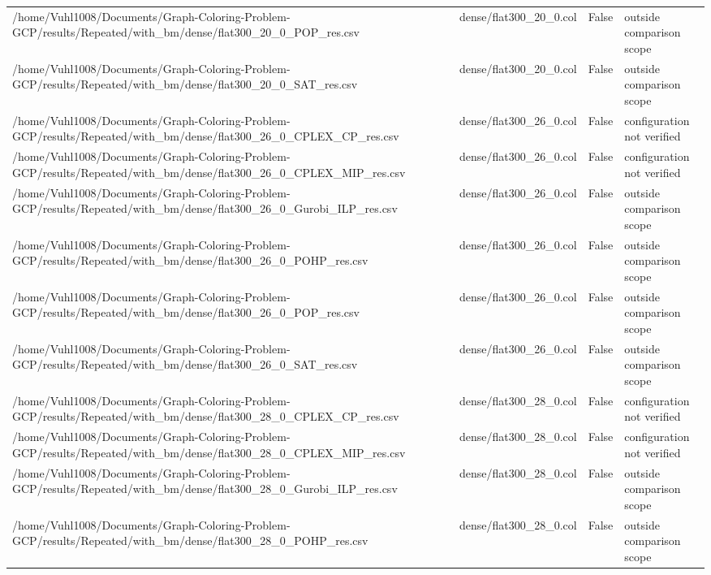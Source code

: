 \begin{table}[htbp]
\begin{tabular}{llll}
/home/Vuhl1008/Documents/Graph-Coloring-Problem-GCP/results/Repeated/with\_bm/dense/flat300\_20\_0\_POP\_res.csv & dense/flat300\_20\_0.col & False & outside comparison scope \\
/home/Vuhl1008/Documents/Graph-Coloring-Problem-GCP/results/Repeated/with\_bm/dense/flat300\_20\_0\_SAT\_res.csv & dense/flat300\_20\_0.col & False & outside comparison scope \\
/home/Vuhl1008/Documents/Graph-Coloring-Problem-GCP/results/Repeated/with\_bm/dense/flat300\_26\_0\_CPLEX\_CP\_res.csv & dense/flat300\_26\_0.col & False & configuration not verified \\
/home/Vuhl1008/Documents/Graph-Coloring-Problem-GCP/results/Repeated/with\_bm/dense/flat300\_26\_0\_CPLEX\_MIP\_res.csv & dense/flat300\_26\_0.col & False & configuration not verified \\
/home/Vuhl1008/Documents/Graph-Coloring-Problem-GCP/results/Repeated/with\_bm/dense/flat300\_26\_0\_Gurobi\_ILP\_res.csv & dense/flat300\_26\_0.col & False & outside comparison scope \\
/home/Vuhl1008/Documents/Graph-Coloring-Problem-GCP/results/Repeated/with\_bm/dense/flat300\_26\_0\_POHP\_res.csv & dense/flat300\_26\_0.col & False & outside comparison scope \\
/home/Vuhl1008/Documents/Graph-Coloring-Problem-GCP/results/Repeated/with\_bm/dense/flat300\_26\_0\_POP\_res.csv & dense/flat300\_26\_0.col & False & outside comparison scope \\
/home/Vuhl1008/Documents/Graph-Coloring-Problem-GCP/results/Repeated/with\_bm/dense/flat300\_26\_0\_SAT\_res.csv & dense/flat300\_26\_0.col & False & outside comparison scope \\
/home/Vuhl1008/Documents/Graph-Coloring-Problem-GCP/results/Repeated/with\_bm/dense/flat300\_28\_0\_CPLEX\_CP\_res.csv & dense/flat300\_28\_0.col & False & configuration not verified \\
/home/Vuhl1008/Documents/Graph-Coloring-Problem-GCP/results/Repeated/with\_bm/dense/flat300\_28\_0\_CPLEX\_MIP\_res.csv & dense/flat300\_28\_0.col & False & configuration not verified \\
/home/Vuhl1008/Documents/Graph-Coloring-Problem-GCP/results/Repeated/with\_bm/dense/flat300\_28\_0\_Gurobi\_ILP\_res.csv & dense/flat300\_28\_0.col & False & outside comparison scope \\
/home/Vuhl1008/Documents/Graph-Coloring-Problem-GCP/results/Repeated/with\_bm/dense/flat300\_28\_0\_POHP\_res.csv & dense/flat300\_28\_0.col & False & outside comparison scope \\

\end{tabular}
\end{table}
